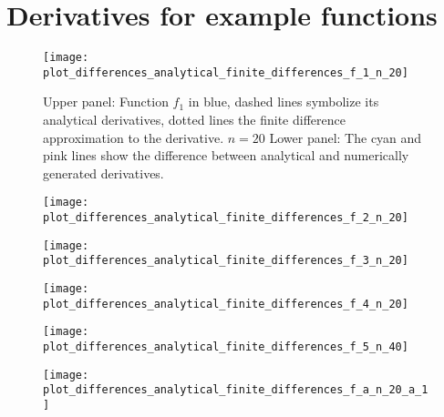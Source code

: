 \section{Derivatives for example functions}

\begin{figure}[h]
		\texttt{[image: plot\_differences\_analytical\_finite\_differences\_f\_1\_n\_20]}
		\caption{Upper panel: Function $f_1$ in blue, dashed lines symbolize its analytical derivatives, dotted lines the finite difference approximation to the derivative. $n= 20$  Lower panel: The cyan and pink lines show the difference between analytical and numerically generated derivatives.}
\end{figure}

\begin{figure}
		\texttt{[image: plot\_differences\_analytical\_finite\_differences\_f\_2\_n\_20]}
		\caption{}
\end{figure}

\begin{figure}
		\texttt{[image: plot\_differences\_analytical\_finite\_differences\_f\_3\_n\_20]}
	\caption{}
\end{figure}

\begin{figure}
		\texttt{[image: plot\_differences\_analytical\_finite\_differences\_f\_4\_n\_20]}
		\caption{}
\end{figure}


\begin{figure}
		\texttt{[image: plot\_differences\_analytical\_finite\_differences\_f\_5\_n\_40]}
		\caption{}
\end{figure}


\begin{figure}
		\texttt{[image: plot\_differences\_analytical\_finite\_differences\_f\_a\_n\_20\_a\_1]}
		\caption{}
\end{figure}

\newpage